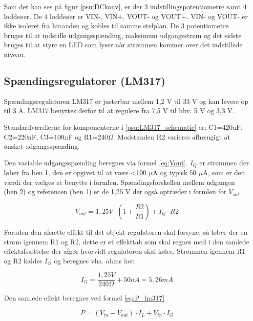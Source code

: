 Som det kan ses på figur \ref{psu:DCkonv}, er der 3 indstillingspotentiometre samt 4 loddeøer. De 4 loddeøer er VIN-, VIN+, VOUT- og VOUT+. VIN- og VOUT- er ikke isoleret fra hinanden og kobles til samme stelplan. De 3 potentiometre bruges til at indstille udgangsspænding, maksimum udgangsstrøm og det sidste bruges til at styre en LED som lyser når strømmen kommer over det indstillede niveau. 

\subsection*{Spændingsregulatorer (LM317)}

Spændingsregulatoren LM317 er justerbar mellem 1,2 V til 33 V og kan levere op til 3 A. LM317 benyttes derfor til at regulere fra 7,5 V til hhv. 5 V og 3,3 V. 


Standardværdierne for komponenterne i \ref{psu:LM317_schematic} er: C1=420uF, C2=220nF, C3=100nF og R1=240$\Omega$. Modstanden R2 varieres afhængigt at ønsket udgangsspænding. 

Den variable udgangsspænding beregnes via formel \ref{eq:Vout}. $I_{Q}$ er strømmen der løber fra ben 1, den er opgivet til at være <100 $\mu$A og typisk 50 $\mu$A, som er den værdi der vælges at benytte i formlen. Spændingsforskellen mellem udgangen (ben 2) og referencen (ben 1) er de 1,25 V der også optræder i formlen for $V_{out}$   

\begin{equation} 
{ V }_{ out }=1,25V\cdot \left( 1+\frac { R2 }{ R1 }  \right) +{ I }_{ Q }\cdot R2
\label{eq:Vout}
\end{equation}

Foruden den afsætte effekt til det objekt regulatoren skal forsyne, så løber der en strøm igennem R1 og R2, dette er et effekttab som skal regnes med i den samlede effektafsættelse der afgør hvorvidt regulatoren skal køles. Strømmen igennem R1 og R2 kaldes $I_{G}$ og beregnes vha. ohms lov:

\begin{equation} 
{ I }_{ G }=\frac { 1,25V }{ 240\Omega  } +50uA=5,26mA
\label{eq:IG}
\end{equation}

Den samlede effekt beregnes ved formel \ref{eq:P_lm317} 

\begin{equation} 
{ P }=({ V }_{ in }-{ V }_{ out })\cdot { I }_{ L }+{ V }_{ in }\cdot { I }_{ G }
\label{eq:P_lm317}
\end{equation}


